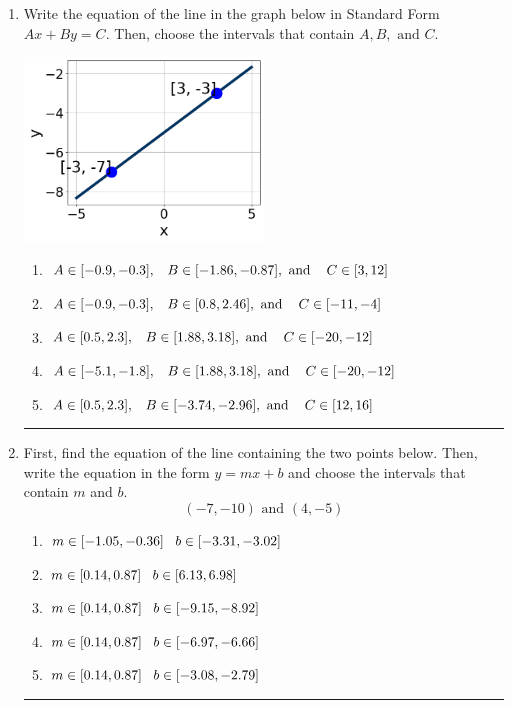 \documentclass[14pt]{extbook}
\newcommand{\litem}[1]{\item#1\hspace*{-1cm}\rule{\textwidth}{0.4pt}}
\begin{document}
\begin{enumerate}
{\begin{enumerate}[label=\Alph*.]
\end{enumerate} }
\litem{
Write the equation of the line in the graph below in Standard Form $Ax+By=C$. Then, choose the intervals that contain $A, B, \text{ and } C$.
\begin{center}
    \includegraphics[width=0.5\textwidth]{../Figures/linearGraphToStandardB.png}
\end{center}
\begin{enumerate}[label=\Alph*.]
\item \( A \in [-0.9, -0.3], \hspace{3mm} B \in [-1.86, -0.87], \text{ and } \hspace{3mm} C \in [3, 12] \)
\item \( A \in [-0.9, -0.3], \hspace{3mm} B \in [0.8, 2.46], \text{ and } \hspace{3mm} C \in [-11, -4] \)
\item \( A \in [0.5, 2.3], \hspace{3mm} B \in [1.88, 3.18], \text{ and } \hspace{3mm} C \in [-20, -12] \)
\item \( A \in [-5.1, -1.8], \hspace{3mm} B \in [1.88, 3.18], \text{ and } \hspace{3mm} C \in [-20, -12] \)
\item \( A \in [0.5, 2.3], \hspace{3mm} B \in [-3.74, -2.96], \text{ and } \hspace{3mm} C \in [12, 16] \)

\end{enumerate} }
\litem{
First, find the equation of the line containing the two points below. Then, write the equation in the form $ y=mx+b $ and choose the intervals that contain $m$ and $b$.\[ (-7, -10) \text{ and } (4, -5) \]\begin{enumerate}[label=\Alph*.]
\item \( m \in [-1.05, -0.36] \hspace*{3mm} b \in [-3.31, -3.02] \)
\item \( m \in [0.14, 0.87] \hspace*{3mm} b \in [6.13, 6.98] \)
\item \( m \in [0.14, 0.87] \hspace*{3mm} b \in [-9.15, -8.92] \)
\item \( m \in [0.14, 0.87] \hspace*{3mm} b \in [-6.97, -6.66] \)
\item \( m \in [0.14, 0.87] \hspace*{3mm} b \in [-3.08, -2.79] \)


\end{enumerate}}
\end{enumerate}
\end{document}
